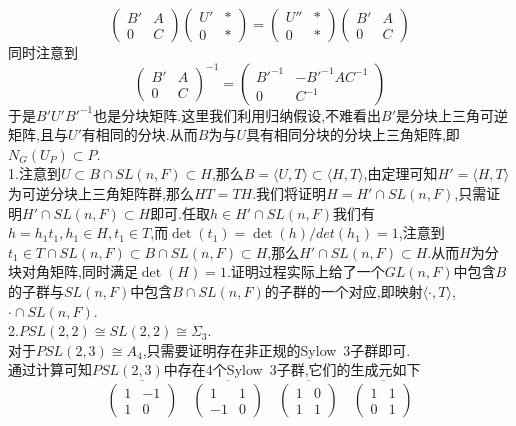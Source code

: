 \documentclass[b5paper]{ctexart}
\begin{document}
\[\left( \begin{array}{cc}
B' & A\\
0 & C
\end{array}\right)
\left( \begin{array}{cc}
U' & \ast\\
0 & \ast
\end{array}\right)=\left( \begin{array}{cc}
U'' & \ast\\
0 & \ast
\end{array}\right)
\left( \begin{array}{cc}
B' & A\\
0 & C
\end{array}\right) \]
同时注意到
\[\left( \begin{array}{cc}
B' & A\\
0 & C
\end{array}\right)^{-1}=\left( \begin{array}{cc}
B'^{-1} & -B'^{-1}AC^{-1}\\
0 & C^{-1}
\end{array}\right)\]
于是$B'U'B'^{-1}$也是分块矩阵.这里我们利用归纳假设,不难看出$B'$是分块上三角可逆矩阵,且与$U'$有相同的分块.从而$B$为与$U$具有相同分块的分块上三角矩阵,即$N_G(U_P)\subset P$.\\
1.注意到$U\subset B\cap SL(n,F)\subset H$,那么$B=\langle U,T\rangle\subset\langle H,T\rangle$,由定理可知$H'=\langle H,T\rangle$为可逆分块上三角矩阵群,那么$HT=TH$.我们将证明$H=H'\cap SL(n,F)$,只需证明$H'\cap SL(n,F)\subset H$即可.任取$h\in H'\cap SL(n,F)$我们有$h=h_1t_1,h_1\in H,t_1\in T
$,而$\det(t_1)=\det(h)/det(h_1)=1$,注意到$t_1\in T\cap SL(n,F)\subset B\cap SL(n,F)\subset H$,那么$H'\cap SL(n,F)\subset H$.从而$H$为分块对角矩阵,同时满足$\det(H)=1.$证明过程实际上给了一个$GL(n,F)$中包含$B$的子群与$SL(n,F)$中包含$B\cap SL(n,F)$的子群的一个对应,即映射$\langle \cdot,T\rangle$,$\cdot\cap SL(n,F)$.\\
2.$PSL(2,2)\cong SL(2,2)\cong \Sigma_3.$\\
对于$PSL(2,3)\cong A_4$,只需要证明存在非正规的Sylow~3子群即可.\\
通过计算可知$PSL(2,3)$中存在4个Sylow~3子群,它们的生成元如下
\[
\overline{\left( \begin{array}{cc}
1 & -1\\
1 & 0
\end{array}\right) }\quad\overline{\left( \begin{array}{cc}
1 & 1\\
-1 & 0
\end{array}\right) }\quad
\overline{\left( \begin{array}{cc}
1 & 0\\
1 & 1
\end{array}\right) }\quad
\overline{\left( \begin{array}{cc}
1 & 1\\
0 & 1
\end{array}\right) }\]
\end{document}
